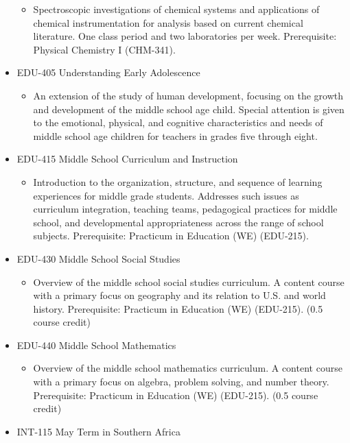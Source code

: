 \documentclass[
  letterpaper,
]{scrbook}
\providecommand{\tightlist}{%
  \setlength{\itemsep}{0pt}\setlength{\parskip}{0pt}}
\begin{document}
\begin{itemize}
  \begin{itemize}
  \tightlist
  \item
    Spectroscopic investigations of chemical systems and applications of
    chemical instrumentation for analysis based on current chemical
    literature. One class period and two laboratories per week.
    Prerequisite: Physical Chemistry I (CHM-341).
  \end{itemize}
\item
  EDU-405 Understanding Early Adolescence

  \begin{itemize}
  \tightlist
  \item
    An extension of the study of human development, focusing on the
    growth and development of the middle school age child. Special
    attention is given to the emotional, physical, and cognitive
    characteristics and needs of middle school age children for teachers
    in grades five through eight.
  \end{itemize}
\item
  EDU-415 Middle School Curriculum and Instruction

  \begin{itemize}
  \tightlist
  \item
    Introduction to the organization, structure, and sequence of
    learning experiences for middle grade students. Addresses such
    issues as curriculum integration, teaching teams, pedagogical
    practices for middle school, and developmental appropriateness
    across the range of school subjects. Prerequisite: Practicum in
    Education (WE) (EDU-215).
  \end{itemize}
\item
  EDU-430 Middle School Social Studies

  \begin{itemize}
  \tightlist
  \item
    Overview of the middle school social studies curriculum. A content
    course with a primary focus on geography and its relation to U.S.
    and world history. Prerequisite: Practicum in Education (WE)
    (EDU-215). (0.5 course credit)
  \end{itemize}
\item
  EDU-440 Middle School Mathematics

  \begin{itemize}
  \tightlist
  \item
    Overview of the middle school mathematics curriculum. A content
    course with a primary focus on algebra, problem solving, and number
    theory. Prerequisite: Practicum in Education (WE) (EDU-215). (0.5
    course credit)
  \end{itemize}
\item
  INT-115 May Term in Southern Africa


\end{itemize}
\end{document}
